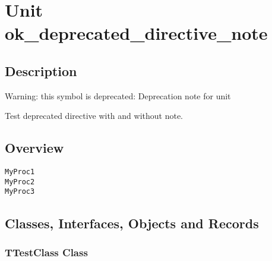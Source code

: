 \documentclass{report}
\newif\ifpdf
\begin{document}
\label{toc}\tableofcontents
\newpage
\newlength{\tmplength}
\chapter{Unit ok{\_}deprecated{\_}directive{\_}note}
\label{ok_deprecated_directive_note}
\section{Description}
Warning: this symbol is deprecated: Deprecation note for unit

Test deprecated directive with and without note.
\section{Overview}
\begin{description}
\item[\texttt{\begin{ttfamily}TTestClass\end{ttfamily} Class}]
\item[\texttt{\begin{ttfamily}TTestClassDeprecated1\end{ttfamily} Class}]
\item[\texttt{\begin{ttfamily}TTestClassDeprecated2\end{ttfamily} Class}]
\end{description}
\begin{description}
\item[\texttt{MyProc1}]
\item[\texttt{MyProc2}]
\item[\texttt{MyProc3}]
\end{description}
\section{Classes, Interfaces, Objects and Records}
\ifpdf
\subsection*{\large{\textbf{TTestClass Class}}\normalsize\hspace{1ex}\hrulefill}
\else
\subsection*{TTestClass Class}
\fi
\label{ok_deprecated_directive_note.TTestClass}
\end{document}
